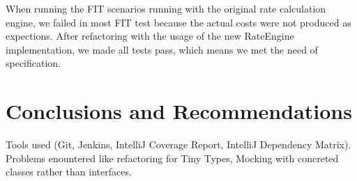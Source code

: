 \documentclass[a4paper,12pt,oneside,final]{article}
\newenvironment{changemargin}[2]{\begin{list}{}{%
\setlength{\topsep}{0pt}%
\setlength{\leftmargin}{0pt}%
\setlength{\rightmargin}{0pt}%
\setlength{\listparindent}{\parindent}%
\setlength{\itemindent}{\parindent}%
\setlength{\parsep}{0pt plus 1pt}%
\addtolength{\leftmargin}{#1}%
\addtolength{\rightmargin}{#2}%
}\item }{\end{list}}
\begin{document}
When running the FIT scenarios running with the original rate calculation engine, we failed in most FIT test because the actual costs were not produced as expections. After refactoring with the usage of the new RateEngine implementation, we made all tests pass, which means we met the need of  specification. 




\section{Conclusions and Recommendations} %
Tools used (Git, Jenkins, IntelliJ Coverage Report, IntelliJ Dependency Matrix).  Problems enountered like refactoring for Tiny Types, Mocking with concreted classes rather than interfaces.
\end{document}
